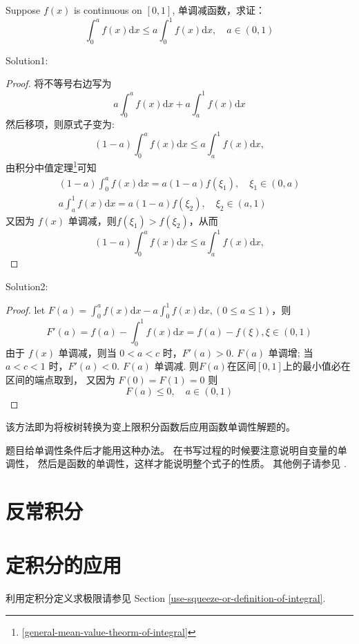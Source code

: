 \begin{example}
    Suppose $f(x)$ is continuous on $[0,1]$, 单调减函数，求证：
    \[
        \int_0^a f(x) \mathrm{d}x \leq a \int_0^1 f(x) \mathrm{d}x, \quad a \in (0, 1)
    \]
    \cite[page 119, pdf 130, example 2]{we}

    Solution1:
    \begin{proof}
        将不等号右边写为
        \[
            a\int_0^a f(x) \mathrm{d}x + a\int_a^1 f(x) \mathrm{d}x
        \]
        然后移项，则原式子变为:
        \[
            (1-a) \int_0^a f(x) \mathrm{d}x \leq a \int_a^1 f(x) \mathrm{d}x,
        \]
        由积分中值定理\footnote{\ref{general-mean-value-theorm-of-integral}}可知
        \begin{align}
            (1-a) \int_0^a f(x) \mathrm{d}x = a(1-a)f(\xi_1), \quad \xi_1 \in (0, a)\\
            a \int_a^1 f(x) \mathrm{d}x = a(1-a)f(\xi_2), \quad \xi_2 \in (a, 1)
        \end{align}
        又因为 $f(x)$ 单调减，则$f(\xi_1) > f(\xi_2)$，从而
        \[
            (1-a) \int_0^a f(x) \mathrm{d}x \leq a \int_a^1 f(x) \mathrm{d}x,
        \]
    \end{proof}

    Solution2:
    \begin{proof}
        let $F(a) = \int_0^a f(x) \mathrm{d}x - a\int_0^1 f(x) \mathrm{d}x, (0 \leq a \leq 1)$，则
        \[
            F'(a) = f(a) -  \int_0^1 f(x)\mathrm{d}x = f(a) - f(\xi), \xi \in (0,1)
        \]
        由于 $f(x)$ 单调减，则当 $0<a<c$ 时，$F'(a) > 0$.
        $F(a)$ 单调增;
        当 $a<c<1$ 时，$F'(a) < 0$.
        $F(a)$ 单调减.
        则$F(a)$在区间$[0,1]$上的最小值必在区间的端点取到，
        又因为 $F(0) = F(1) =0$ 则
        \[
            F(a) \leq 0, \quad a \in (0, 1)
        \]
    \end{proof}
    该方法即为将桉树转换为变上限积分函数后应用函数单调性解题的。
\end{example}

题目给单调性条件后才能用这种办法。
在书写过程的时候要注意说明自变量的单调性，
然后是函数的单调性，这样才能说明整个式子的性质。
其他例子请参见 \cite[page 119, pdf 130]{we}.



\section{反常积分}



\section{定积分的应用}\label{app-finite-integral}

利用定积分定义求极限请参见
Section \ref{use-squeeze-or-definition-of-integral}.
